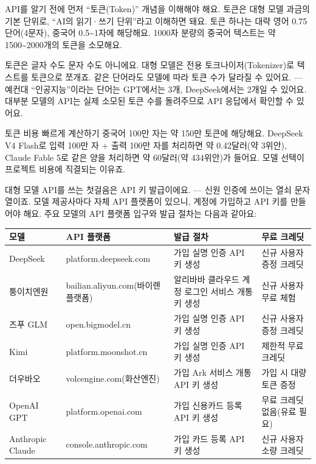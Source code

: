 
API를 알기 전에 먼저 “토큰(Token)” 개념을 이해해야 해요. 토큰은 대형 모델 과금의 기본 단위로, “AI의 읽기·쓰기 단위”라고 이해하면 돼요. 토큰 하나는 대략 영어 0.75 단어(4문자), 중국어 0.5\textasciitilde{}1자에 해당해요. 1000자 분량의 중국어 텍스트는 약 1500\textasciitilde{}2000개의 토큰을 소모해요.

토큰은 글자 수도 문자 수도 아니에요. 대형 모델은 전용 토크나이저(Tokenizer)로 텍스트를 토큰으로 쪼개죠. 같은 단어라도 모델에 따라 토큰 수가 달라질 수 있어요. — 예컨대 “인공지능”이라는 단어는 GPT에서는 3개, DeepSeek에서는 2개일 수 있어요. 대부분 모델의 API는 실제 소모된 토큰 수를 돌려주므로 API 응답에서 확인할 수 있어요.

\begin{tcbinfo}{토큰 비용 빠르게 계산하기}
중국어 100만 자는 약 150만 토큰에 해당해요. DeepSeek V4 Flash로 입력 100만 자 + 출력 100만 자를 처리하면 약 0.42달러(약 3위안), Claude Fable 5로 같은 양을 처리하면 약 60달러(약 434위안)가 들어요. 모델 선택이 프로젝트 비용에 직결되는 이유죠.

\end{tcbinfo}


대형 모델 API를 쓰는 첫걸음은 API 키 발급이에요. — 신원 인증에 쓰이는 열쇠 문자열이죠. 모델 제공사마다 자체 API 플랫폼이 있으니, 계정에 가입하고 API 키를 만들어야 해요. 주요 모델의 API 플랫폼 입구와 발급 절차는 다음과 같아요:

\begin{center}
\begin{tabularx}{\linewidth}{|X|X|X|X|}
\hline
\textbf{모델} & \textbf{API 플랫폼} & \textbf{발급 절차} & \textbf{무료 크레딧} \tabularnewline
\hline
DeepSeek & platform.deepseek.com & 가입 실명 인증 API 키 생성 & 신규 사용자 증정 크레딧 \tabularnewline
퉁이치엔원 & bailian.aliyun.com(바이롄 플랫폼) & 알리바바 클라우드 계정 로그인 서비스 개통 키 생성 & 신규 사용자 무료 체험 \tabularnewline
즈푸 GLM & open.bigmodel.cn & 가입 실명 인증 API 키 생성 & 신규 사용자 증정 크레딧 \tabularnewline
Kimi & platform.moonshot.cn & 가입 실명 인증 API 키 생성 & 제한적 무료 크레딧 \tabularnewline
더우바오 & volcengine.com(화산엔진) & 가입 Ark 서비스 개통 API 키 생성 & 가입 시 대량 토큰 증정 \tabularnewline
OpenAI GPT & platform.openai.com & 가입 신용카드 등록 API 키 생성 & 무료 크레딧 없음(유료 필요) \tabularnewline
Anthropic Claude & console.anthropic.com & 가입 카드 등록 API 키 생성 & 신규 사용자 소량 크레딧 \tabularnewline
\hline
\end{tabularx}
\end{center}


